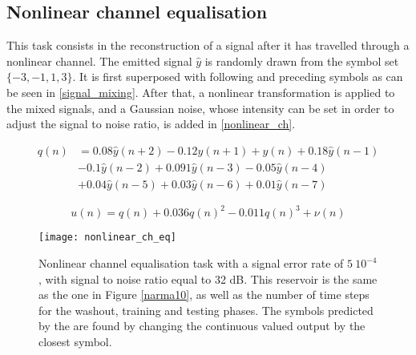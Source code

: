 \subsection{Nonlinear channel equalisation}

This task consists in the reconstruction of a signal after it has travelled through a nonlinear channel. The emitted signal $\hat{y}$ is randomly drawn from the symbol set $\{-3,-1,1,3\}$. It is first superposed with following and preceding symbols as can be seen in \eqref{signal_mixing}. After that, a nonlinear transformation is applied to the mixed signals, and a Gaussian noise, whose intensity can be set in order to adjust the signal to noise ratio, is added in \eqref{nonlinear_ch}. 

\begin{align}
	q(n) &= 0.08\hat{y}(n+2)-0.12\hat{y}(n+1)+\hat{y}(n)+0.18\hat{y}(n-1) \nonumber\\
	&-0.1\hat{y}(n-2)+0.091\hat{y}(n-3)-0.05\hat{y}(n-4) \nonumber\\
	&+0.04\hat{y}(n-5)+0.03\hat{y}(n-6)+0.01\hat{y}(n-7) \label{signal_mixing}
\end{align}

\begin{equation}
	u(n)=q(n)+0.036q(n)^2-0.011q(n)^3+\nu(n)
	\label{nonlinear_ch}
\end{equation}

\begin{figure}[h]
	\centering
	\texttt{[image: nonlinear\_ch\_eq]}
	\caption{Nonlinear channel equalisation task with a signal error rate of $5~10^{-4}$, with signal to noise ratio equal to 32 dB. This reservoir is the same as the one in Figure \ref{narma10}, as well as the number of time steps for the washout, training and testing phases. The symbols predicted by the \rcer are found by changing the continuous valued output by the closest symbol.}
\end{figure}
